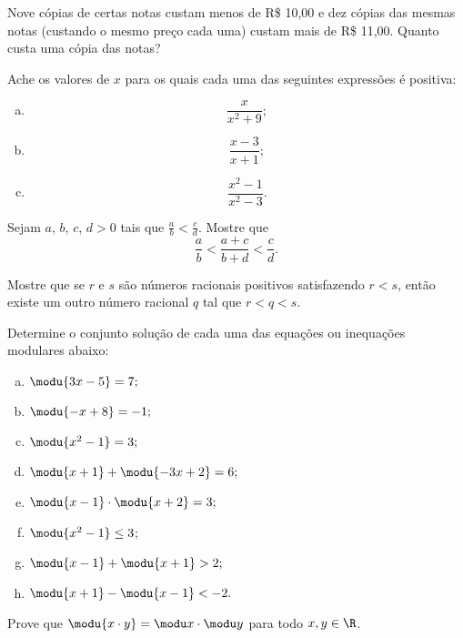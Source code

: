 \begin{exercise}
Nove cópias de certas notas custam menos de R\$ 10,00 e dez
cópias das mesmas notas (custando o mesmo preço cada uma) custam
mais de R\$ 11,00. Quanto custa uma cópia das notas? 
\end{exercise}

\begin{exercise}
Ache os valores de $x$ para os quais cada uma das seguintes
expressões é positiva:
\begin{enumerate}[a.]
  \item $$\frac x {x^2+9};$$
  \item $$\frac{x-3}{x+1};$$
  \item $$\frac{x^2-1}{x^2-3}.$$
\end{enumerate}
\end{exercise}

\begin{exercise}
Sejam  $a$, $b$, $c$, $d > 0$ tais que $\frac a b < \frac c d$.
Mostre que $$\frac a b < \frac {a+c} {b+d} < \frac c d.$$
\end{exercise}

\begin{exercise}
  Mostre que se $r$ e $s$ são números racionais positivos satisfazendo $r < s$,
  então existe um outro número racional $q$ tal que $r<q<s$.
\end{exercise}

\begin{exercise}
Determine o conjunto solução de cada uma das equações ou
inequações modulares abaixo:
\begin{enumerate}[a.]
  \item $\modu {3x - 5}= 7;$
  \item $\modu {-x +8} = -1;$
  \item $\modu{x^2 - 1}= 3;$
  \item $\modu{x +1} + \modu { -3x +2} = 6;$
  \item $\modu{x-1} \cdot \modu{x+2} = 3;$
  \item $\modu{x^2-1}\le 3$;
  \item $\modu{x-1}+ \modu{x+1}>2;$
  \item $\modu{x+1}- \modu{x-1}<-2.$
\end{enumerate}
\end{exercise}

\begin{exercise}
Prove que $\modu{x\cdot y } = \modu x \cdot \modu y$ para todo
$x, y \in \R$.
\end{exercise}

